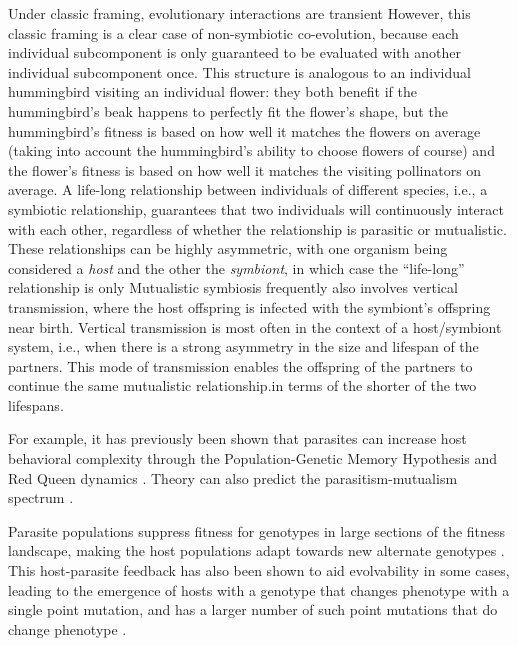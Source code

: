 Under classic framing, evolutionary interactions are transient \citep{potter2000cooperative,ma2018survey, pan2022effective, gong2015distributed, goh2008competitive, antonio2017coevolutionary,hancer2025survey, wiegand2004analysis, garcia2005cooperative, wiegand2001empirical, byrski2015evolutionary} 
However, this classic framing is a clear case of non-symbiotic co-evolution, because each individual subcomponent is only guaranteed to be evaluated with another individual subcomponent once.
This structure is analogous to an individual hummingbird visiting an individual flower: they both benefit if the hummingbird's beak happens to perfectly fit the flower's shape, but the hummingbird's fitness is based on how well it matches the flowers on average (taking into account the hummingbird's ability to choose flowers of course) and the flower's fitness is based on how well it matches the visiting pollinators on average.
A life-long relationship between individuals of different species, i.e., a symbiotic relationship, guarantees that two individuals will continuously interact with each other, regardless of whether the relationship is parasitic or mutualistic.
These relationships can be highly asymmetric, with one organism being considered a \textit{host} and the other the \textit{symbiont}, in which case the ``life-long'' relationship is only
Mutualistic symbiosis frequently also involves vertical transmission, where the host offspring is infected with the symbiont's offspring near birth.
Vertical transmission is most often in the context of a host/symbiont system, i.e., when there is a strong asymmetry in the size and lifespan of the partners.
This mode of transmission enables the offspring of the partners to continue the same mutualistic relationship.in terms of the shorter of the two lifespans.

For example, it has previously been shown that parasites can increase host behavioral complexity through the Population-Genetic Memory Hypothesis and Red Queen dynamics \citep{ladle1992parasites,zaman2014coevolution}.
Theory can also predict the parasitism-mutualism spectrum \citep{vostinar2019spatial,johnson2021coevolutionary}.

Parasite populations suppress fitness for genotypes in large sections of the fitness landscape, making the host populations adapt towards new alternate genotypes \citep{gupta2022hostparasite,zaman2014coevolution,kussell2006polymerpopulation, kumawat2021architecture}.
This host-parasite feedback has also been shown to aid evolvability in some cases, leading to the emergence of hosts with a genotype that changes phenotype with a single point mutation, and has a larger number of such point mutations that do change phenotype \cite{zaman2014coevolution}.

